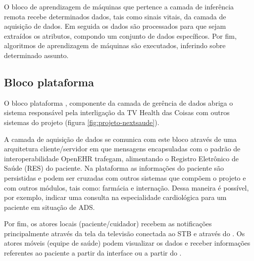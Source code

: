 O bloco de aprendizagem de máquinas que pertence a camada de inferência remota
recebe determinados dados, tais como sinais vitais, da camada de aquisição de
dados. Em seguida os dados são processados para que sejam extraídos os atributos,
compondo um conjunto de dados específicos. Por fim, algoritmos de aprendizagem
de máquinas são executados, inferindo sobre determinado assunto.

\subsection{Bloco plataforma \nextsaude}

O bloco plataforma \nextsaude[], componente da camada de gerência de dados abriga
o sistema responsável pela interligação da TV Health das Coisas com outros sistemas
do projeto \nextsaude[] (figura \ref{fig:projeto-nextsaude}).


A camada de aquisição de dados se comunica com este bloco através de uma
arquitetura cliente/servidor em que mensagens encapsuladas com o padrão
de interoperabilidade OpenEHR trafegam, alimentando o Registro Eletrônico
de Saúde (RES) do paciente. Na plataforma as informações do paciente são
persistidas e podem ser cruzadas com outros sistemas que compõem o projeto
\nextsaude e com outros módulos, tais como: farmácia e internação.
Dessa maneira é possível, por exemplo, indicar uma consulta na especialidade
cardiológica para um paciente em situação de ADS.



Por fim, os atores locais (paciente/cuidador) 
recebem as notificações principalmente através da tela da televisão conectada ao 
STB e através do \smartphone. Os atores móveis (equipe de saúde) podem visualizar 
os dados e receber informações referentes ao paciente a partir da interface \web[] ou 
a partir do \smartphone.





